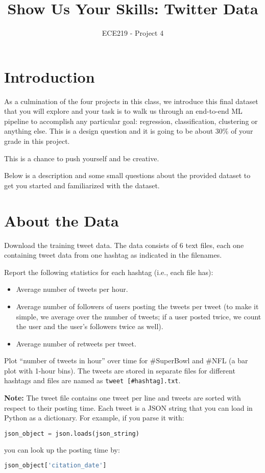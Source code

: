 \documentclass[12pt]{article}
\title{Show Us Your Skills: Twitter Data}
\author{ECE219 - Project 4}
\date{}
\begin{document}
\maketitle

\section{Introduction}

As a culmination of the four projects in this class, we introduce this final dataset that you will explore and your task is to walk us through an end-to-end ML pipeline to accomplish any particular goal: regression, classification, clustering or anything else. This is a design question and it is going to be about 30\% of your grade in this project.

This is a chance to push yourself and be creative.

Below is a description and some small questions about the provided dataset to get you started and familiarized with the dataset.

\section{About the Data}

Download the training tweet data. The data consists of 6 text files, each one containing tweet data from one hashtag as indicated in the filenames.

Report the following statistics for each hashtag (i.e., each file has):
\begin{itemize}
    \item Average number of tweets per hour.
    \item Average number of followers of users posting the tweets per tweet (to make it simple, we average over the number of tweets; if a user posted twice, we count the user and the user’s followers twice as well).
    \item Average number of retweets per tweet.
\end{itemize}

Plot “number of tweets in hour” over time for \#SuperBowl and \#NFL (a bar plot with 1-hour bins). The tweets are stored in separate files for different hashtags and files are named as \texttt{tweet [\#hashtag].txt}.

\textbf{Note:} The tweet file contains one tweet per line and tweets are sorted with respect to their posting time. Each tweet is a JSON string that you can load in Python as a dictionary. For example, if you parse it with:
\begin{lstlisting}[language=Python]
json_object = json.loads(json_string)
\end{lstlisting}
you can look up the posting time by:
\begin{lstlisting}[language=Python]
json_object['citation_date']
\end{lstlisting}
\end{document}
